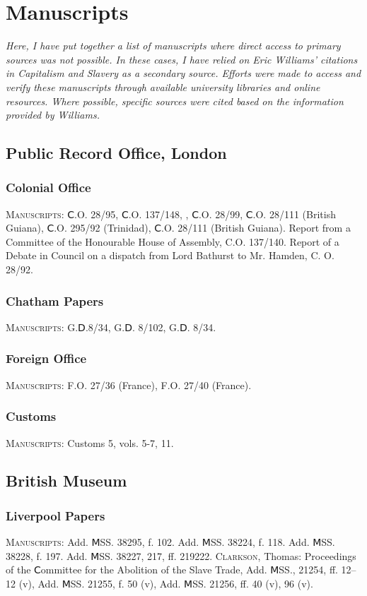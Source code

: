 \chapter*{Manuscripts}
\textit{Here, I have put together a list of manuscripts where direct access to primary sources was not possible. In these cases, I have relied on Eric Williams' citations in Capitalism and Slavery as a secondary source. Efforts were made to access and verify these manuscripts through available university libraries and online resources. Where possible, specific sources were cited based on the information provided by Williams.}
\section{Public Record Office, London}
\subsection{Colonial Office}
\textsc{Manuscripts}: Ⅽ.O. 28/95, Ⅽ.O. 137/148, , Ⅽ.O. 28/99, Ⅽ.O. 28/111 (British Guiana), Ⅽ.O. 295/92 (Trinidad), Ⅽ.O. 28/111 (British Guiana). Report from a Committee of the Honourable House of Assembly, C.O. 137/140. Report of a Debate in Council on a dispatch from Lord Bathurst to Mr. Hamden, C. O. 28/92.
\subsection{Chatham Papers}
\textsc{Manuscripts}: G.Ⅾ.8/34, G.Ⅾ. 8/102, G.Ⅾ. 8/34.
\subsection{Foreign Office}
\textsc{Manuscripts}: F.O. 27/36 (France), F.O. 27/40 (France).
\subsection{Customs}
\textsc{Manuscripts}: Customs 5, vols. 5-7, 11.
\section{British Museum}
\subsection{Liverpool Papers}
\textsc{Manuscripts}: Add. ⅯSS. 38295, f. 102. Add. ⅯSS. 38224, f. 118. Add. ⅯSS. 38228, f. 197. Add. ⅯSS. 38227, 217, ff. 219222. \textsc{Clarkson}, Thomas: Proceedings of the Ⅽommittee for the Abolition of the Slave Trade, Add. ⅯSS., 21254, ff. 12–12 (v), Add. ⅯSS. 21255, f. 50 (v), Add. ⅯSS. 21256, ff. 40 (v), 96 (v). 
